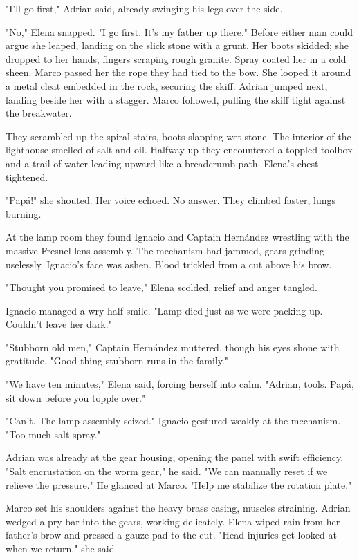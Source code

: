 "I'll go first," Adrian said, already swinging his legs over the side.

"No," Elena snapped. "I go first. It's my father up there." Before either man could argue she leaped, landing on the slick stone with a grunt. Her boots skidded; she dropped to her hands, fingers scraping rough granite. Spray coated her in a cold sheen. Marco passed her the rope they had tied to the bow. She looped it around a metal cleat embedded in the rock, securing the skiff. Adrian jumped next, landing beside her with a stagger. Marco followed, pulling the skiff tight against the breakwater.

They scrambled up the spiral stairs, boots slapping wet stone. The interior of the lighthouse smelled of salt and oil. Halfway up they encountered a toppled toolbox and a trail of water leading upward like a breadcrumb path. Elena's chest tightened.

"Papá!" she shouted. Her voice echoed. No answer. They climbed faster, lungs burning.

At the lamp room they found Ignacio and Captain Hernández wrestling with the massive Fresnel lens assembly. The mechanism had jammed, gears grinding uselessly. Ignacio's face was ashen. Blood trickled from a cut above his brow.

"Thought you promised to leave," Elena scolded, relief and anger tangled.

Ignacio managed a wry half-smile. "Lamp died just as we were packing up. Couldn't leave her dark."

"Stubborn old men," Captain Hernández muttered, though his eyes shone with gratitude. "Good thing stubborn runs in the family."

"We have ten minutes," Elena said, forcing herself into calm. "Adrian, tools. Papá, sit down before you topple over."

"Can't. The lamp assembly seized." Ignacio gestured weakly at the mechanism. "Too much salt spray."

Adrian was already at the gear housing, opening the panel with swift efficiency. "Salt encrustation on the worm gear," he said. "We can manually reset if we relieve the pressure." He glanced at Marco. "Help me stabilize the rotation plate."

Marco set his shoulders against the heavy brass casing, muscles straining. Adrian wedged a pry bar into the gears, working delicately. Elena wiped rain from her father's brow and pressed a gauze pad to the cut. "Head injuries get looked at when we return," she said.

